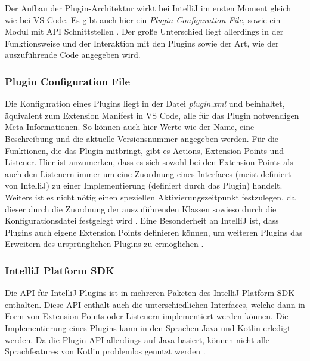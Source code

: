 Der Aufbau der Plugin-Architektur wirkt bei IntelliJ im ersten Moment 
gleich wie bei VS Code. Es gibt auch hier ein \emph{Plugin Configuration File}, 
sowie ein Modul mit API Schnittstellen \cite{IntelliJPlatformSDKPluginStructure}.
Der große Unterschied liegt allerdings in der Funktionsweise und der Interaktion
mit den Plugins sowie der Art, wie der auszuführende Code angegeben wird.
\subsubsection{Plugin Configuration File}
  Die Konfiguration eines Plugins liegt in der Datei \emph{plugin.xml} und
  beinhaltet, äquivalent zum Extension Manifest in VS Code, alle für das Plugin
  notwendigen Meta-Informationen. So können auch hier Werte wie der Name,
  eine Beschreibung und die aktuelle Versionsnummer angegeben werden.
  Für die Funktionen, die das Plugin mitbringt, gibt es Actions, Extension Points
  und Listener. Hier ist anzumerken, dass es sich sowohl bei den Extension Points
  als auch den Listenern immer um eine Zuordnung eines Interfaces
  (meist definiert von IntelliJ) zu einer Implementierung (definiert durch das Plugin)
  handelt. Weiters ist es nicht nötig einen speziellen Aktivierungszeitpunkt
  festzulegen, da dieser durch die Zuordnung der auszuführenden Klassen sowieso durch 
  die Konfigurationsdatei festgelegt wird \cite{IntelliJPlatformSDKPluginConfigurationFile}. 
  Eine Besonderheit an IntelliJ ist,
  dass Plugins auch eigene Extension Points definieren können, um weiteren Plugins
  das Erweitern des ursprünglichen Plugins zu ermöglichen
  \cite{IntelliJPlatformSDKExtensionPoints}.
\subsubsection{IntelliJ Platform SDK}
  Die API für IntelliJ Plugins ist in mehreren Paketen des IntelliJ 
  Platform SDK enthalten. Diese API enthält auch die unterschiedlichen
  Interfaces, welche dann in Form von Extension Points oder Listenern implementiert
  werden können. Die Implementierung eines Plugins kann in den Sprachen Java
  und Kotlin erledigt werden. Da die Plugin API allerdings auf Java basiert, können
  nicht alle Sprachfeatures von Kotlin problemlos genutzt werden 
  \cite{IntelliJPlatformSDKConfiguringKotlinSupport}.
